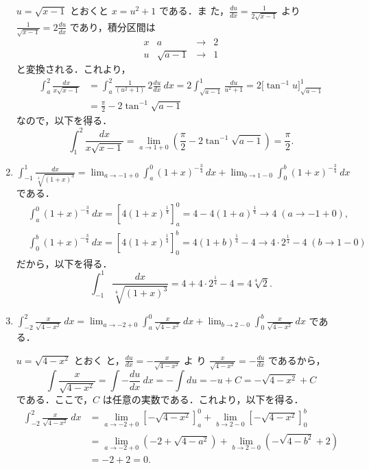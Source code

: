 \documentclass[11pt, uplatex, dvipdfmx]{jsarticle}
\newcommand{\ds}{\displaystyle}
\begin{document}
\begin{enumerate}[(1)]
     $u=\sqrt{x-1}$ とおくと $x=u^2+1$ である．ま
     た，$\frac{du}{dx}=\frac{1}{2\sqrt{x-1}}$ より $\frac{1}{\sqrt{x-1}} = 2 \frac{du}{dx}$ であり，積分区間は
     \[
       \begin{array}{c|ccc}
         x & a & \to & 2 \\ \hline
         u & \sqrt{a-1} & \to & 1
       \end{array}
     \]
     と変換される．これより，
     \begin{align*}
       \int_{a}^{2} \frac{dx}{x\sqrt{x-1}} 
       &= \int_{a}^{2} \frac{1}{(u^2+1)} \ 2 \frac{du}{dx} \ dx 
         = 2\int_{\sqrt{a-1}}^{1} \frac{du}{u^2+1} = 2 \Big[ \tan^{-1} u \Big]_{\sqrt{a-1}}^{1} \\
       &= \frac{\pi}{2} - 2 \tan^{-1} \sqrt{a-1}
     \end{align*}
     なので，以下を得る．
     \[
       \int_{1}^{2} \frac{dx}{x\sqrt{x-1}} = \lim_{a \to 1+0} \left( \frac{\pi}{2} - 2 \tan^{-1}\sqrt{a-1} \right)
       = \frac{\pi}{2}.
     \]

   \item $\ds \int_{-1}^{1} \frac{dx}{\sqrt[4]{(1+x)^3}} 
     = \lim_{a \to -1+0} \int_{a}^{0} \left(1+x \right)^{-\frac{3}{4}} \ dx
     + \lim_{b \to 1-0} \int_{0}^{b} \left( 1+x \right)^{-\frac{3}{4}} \ dx$ である．
     \begin{align*}
        &\int_{a}^{0} (1+x)^{-\frac{3}{4}} \ dx = \left[ 4 (1+x)^{\frac{1}{4}} \right]_{a}^{0}
          = 4 - 4 \left( 1+a\right)^{\frac{1}{4}} \to 4 \; ( a \to -1+0),\\
        &\int_{0}^{b} (1+x)^{-\frac{3}{4}} \ dx = \left[ 4 (1+x)^{\frac{1}{4}} \right]_{0}^{b}
       = 4\left( 1+b\right)^{\frac{1}{4}} - 4 \to 4 \cdot 2^{\frac{1}{4}}-4 \; (b \to 1-0)
     \end{align*}
     だから，以下を得る．
     \[
       \int_{-1}^{1} \frac{dx}{\sqrt[4]{(1+x)^3}} = 4+ 4 \cdot 2^{\frac{1}{4}} - 4 = 4 \sqrt[4]{2}.
     \]

   \item
     $\ds \int_{-2}^{2} \frac{x}{\sqrt{4-x^2}} \ dx = \lim_{a \to
       -2+0} \int_{a}^{0} \frac{x}{\sqrt{4-x^2}} \ dx + \lim_{b \to
       2-0} \int_{0}^{b} \frac{x}{\sqrt{4-x^2}} \ dx$ である．

     \vspace{1zh}
     
     $\ds u=\sqrt{4-x^2}$ とおく
     と，$\ds \frac{du}{dx}=-\frac{x}{\sqrt{4-x^2}}$ よ
     り $\ds \frac{x}{\sqrt{4-x^2}} = -\frac{du}{dx}$ であるから，
     \[
       \int \frac{x}{\sqrt{4-x^2}} = \int -\frac{du}{dx} \ dx = -\int du = -u+C = -\sqrt{4-x^2}+C
     \]
     である．ここで，$C$ は任意の実数である．これより，以下を得る．
     \begin{align*}
       \int_{-2}^{2} \frac{x}{\sqrt{4-x^2}} \ dx 
       &= \lim_{a \to -2+0} \left[ -\sqrt{4-x^2} \right]_{a}^{0} 
         + \lim_{b \to 2-0} \left[ -\sqrt{4-x^2} \right]_{0}^{b}\\
       &= \lim_{a \to -2+0} \left( -2 +\sqrt{4-a^2}\right)
         + \lim_{b \to 2-0} \left( -\sqrt{4-b^2} +2\right)\\
       &= -2 + 2 = 0.
     \end{align*}


\end{enumerate}
\end{document}
